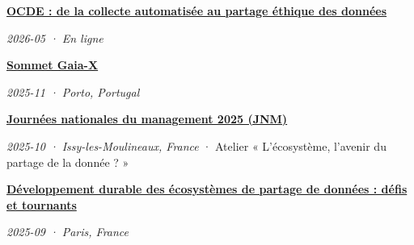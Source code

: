 \documentclass[11pt,a4paper]{article}
\newlength{\cvindent}
\newenvironment{cvblock}[1][1]{%
  \par\noindent\hspace*{#1\cvindent}%
  \begin{minipage}{\dimexpr\linewidth-#1\cvindent\relax}%
}{%
  \end{minipage}\par
}
\newenvironment{cvdetails}{%
  \begin{list}{}{%
    \setlength{\leftmargin}{\cvindent}%
    \setlength{\rightmargin}{0pt}%
    \setlength{\topsep}{0.1em}%
    \setlength{\partopsep}{0pt}%
    \setlength{\parsep}{0.05em}%
    \setlength{\itemsep}{0pt}%
  }\item[]\small\ignorespaces
}{%
  \end{list}
}
\begin{document}
\begin{cvblock}[2]
\textbf{\href{https://oecd.ai/en/wonk/documents/from-scraping-to-ethical-sharing-initial-considerations-for-virtuous-innovative-approaches-and-data-use-collaboration-in-ai-training-viaduct}{OCDE : de la collecte automatisée au partage éthique des données}}\par
\begin{cvdetails}
{\small\itshape 2026-05 · En ligne}\par
\end{cvdetails}
\end{cvblock}\par\vspace{0.35em}

\begin{cvblock}[2]
\textbf{\href{https://gaia-x.eu/summit-2025/}{Sommet Gaia-X}}\par
\begin{cvdetails}
{\small\itshape 2025-11 · Porto, Portugal}\par
\end{cvdetails}
\end{cvblock}\par\vspace{0.35em}

\begin{cvblock}[2]
\textbf{\href{https://digipad.app/p/1136550/f7ad9c6a3886f}{Journées nationales du management 2025 (JNM)}}\par
\begin{cvdetails}
{\small\itshape 2025-10 · Issy-les-Moulineaux, France} · Atelier « L’écosystème, l’avenir du partage de la donnée ? »\par
\end{cvdetails}
\end{cvblock}\par\vspace{0.35em}

\begin{cvblock}[2]
\textbf{\href{https://www.fondation-dauphine.fr/agenda/2025/08/sustainable-development-data-sharing-ecosystems-challenges-and-turning-points}{Développement durable des écosystèmes de partage de données : défis et tournants}}\par
\begin{cvdetails}
{\small\itshape 2025-09 · Paris, France}\par
\end{cvdetails}
\end{cvblock}\par\vspace{0.35em}
\end{document}
